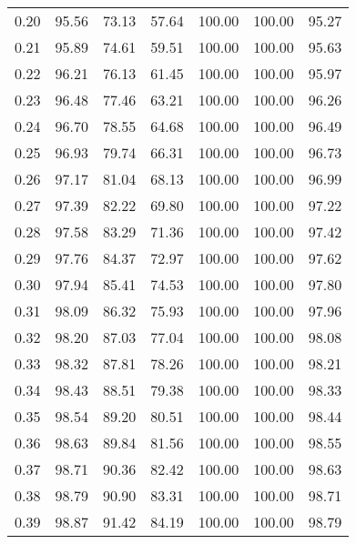 \begin{tabular}{|c|c|c|c|c|c|c|}
      0.20 &     95.56 &     73.13 &      57.64 &  100.00 &     100.00 &         95.27 \\
      0.21 &     95.89 &     74.61 &      59.51 &  100.00 &     100.00 &         95.63 \\
      0.22 &     96.21 &     76.13 &      61.45 &  100.00 &     100.00 &         95.97 \\
      0.23 &     96.48 &     77.46 &      63.21 &  100.00 &     100.00 &         96.26 \\
      0.24 &     96.70 &     78.55 &      64.68 &  100.00 &     100.00 &         96.49 \\
      0.25 &     96.93 &     79.74 &      66.31 &  100.00 &     100.00 &         96.73 \\
      0.26 &     97.17 &     81.04 &      68.13 &  100.00 &     100.00 &         96.99 \\
      0.27 &     97.39 &     82.22 &      69.80 &  100.00 &     100.00 &         97.22 \\
      0.28 &     97.58 &     83.29 &      71.36 &  100.00 &     100.00 &         97.42 \\
      0.29 &     97.76 &     84.37 &      72.97 &  100.00 &     100.00 &         97.62 \\
      0.30 &     97.94 &     85.41 &      74.53 &  100.00 &     100.00 &         97.80 \\
      0.31 &     98.09 &     86.32 &      75.93 &  100.00 &     100.00 &         97.96 \\
      0.32 &     98.20 &     87.03 &      77.04 &  100.00 &     100.00 &         98.08 \\
      0.33 &     98.32 &     87.81 &      78.26 &  100.00 &     100.00 &         98.21 \\
      0.34 &     98.43 &     88.51 &      79.38 &  100.00 &     100.00 &         98.33 \\
      0.35 &     98.54 &     89.20 &      80.51 &  100.00 &     100.00 &         98.44 \\
      0.36 &     98.63 &     89.84 &      81.56 &  100.00 &     100.00 &         98.55 \\
      0.37 &     98.71 &     90.36 &      82.42 &  100.00 &     100.00 &         98.63 \\
      0.38 &     98.79 &     90.90 &      83.31 &  100.00 &     100.00 &         98.71 \\
      0.39 &     98.87 &     91.42 &      84.19 &  100.00 &     100.00 &         98.79 \\

\end{tabular}
